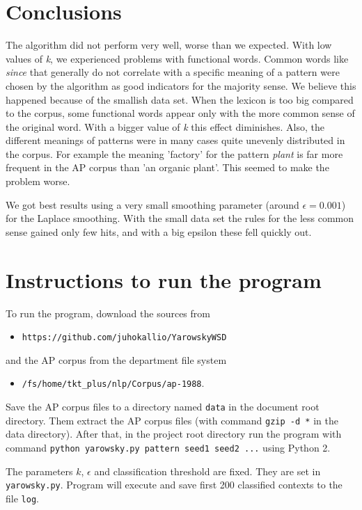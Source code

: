 \documentclass[finnish]{article}
\begin{document}
\section{Conclusions}
The algorithm did not perform very well, worse than we expected. With low values of \emph{k}, we experienced problems with functional words. Common words like \emph{since} that generally do not correlate with a specific meaning of a pattern were chosen by the algorithm as good indicators for the majority sense. We believe this happened because of the smallish data set. When the lexicon is too big compared to the corpus, some functional words appear only with the more common sense of the original word. With a bigger value of \emph{k} this effect diminishes. Also, the different meanings of patterns were in many cases quite unevenly distributed in the corpus. For example the meaning 'factory' for the pattern \emph{plant} is far more frequent in the AP corpus than 'an organic plant'. This seemed to make the problem worse.

We got best results using a very small smoothing parameter (around $\epsilon = 0.001$) for the Laplace smoothing.  With the small data set the rules for the less common sense gained only few hits, and with a big epsilon these fell quickly out.

\section{Instructions to run the program}
To run the program, download the sources from
\begin{itemize}
\item \texttt{https://github.com/juhokallio/YarowskyWSD}
\end{itemize}
\noindent and the AP corpus from the department file system
\begin{itemize}
\item \texttt{/fs/home/tkt\_plus/nlp/Corpus/ap-1988}.
\end{itemize}

Save the AP corpus files to a directory named \texttt{data} in the document root directory. Them extract the AP corpus files (with command \texttt{gzip -d *} in the data directory). After that, in the project root directory run the program with command \texttt{python yarowsky.py pattern seed1 seed2 ...} using Python 2.

The parameters $k$, $\epsilon$ and classification threshold are fixed. They are set in \texttt{yarowsky.py}. Program will execute and save first 200 classified contexts to the file \texttt{log}.
\end{document}
